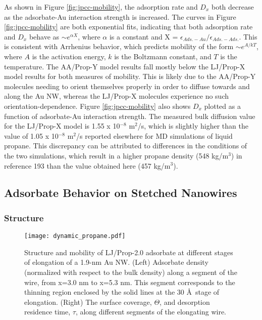 \documentclass[10pt]{report}  %
\begin{document}
As shown in Figure \ref{fig:jpcc-mobility}, the adsorption rate and $D_x$ both decrease as the adsorbate-Au interaction strength is increased.  The curves in Figure \ref{fig:jpcc-mobility} are both exponential fits, indicating that both adsorption rate and $D_x$ behave as $\sim$$e^{\alpha X}$, where $\alpha$ is a constant and X = $\epsilon_{Ads.-Au}/\epsilon_{Ads.-Ads.}$.  This is consistent with Arrhenius behavior, which predicts mobility of the form $\sim$$e^{A/kT}$, where $A$ is the activation energy, $k$ is the Boltzmann constant, and $T$ is the temperature. The AA/Prop-Y model results fall mostly below the LJ/Prop-X model results for both measures of mobility.  This is likely due to the AA/Prop-Y molecules needing to orient themselves properly in order to diffuse towards and along the Au NW, whereas the LJ/Prop-X molecules experience no such orientation-dependence.  Figure \ref{fig:jpcc-mobility} also shows $D_x$ plotted as a function of adsorbate-Au interaction strength.  The measured bulk diffusion value for the LJ/Prop-X model is 1.55 x 10$^{-8}$ m$^2$/s, which is slightly higher than the value of 1.05 x 10$^{-8}$ m$^2$/s reported elsewhere for MD simulations of liquid propane.\cite{Krishna:2005}  This discrepancy can be attributed to differences in the conditions of the two simulations, which result in a higher propane density (548 kg/m$^3$) in reference 193 than the value obtained here (457 kg/m$^3$).

\subsection{Adsorbate Behavior on Stetched Nanowires}

\subsubsection{Structure}

%
%
\begin{figure}[b!]
	\centering
	\texttt{[image: dynamic\_propane.pdf]}
	\caption{Structure and mobility of LJ/Prop-2.0 adsorbate at different stages of elongation of a 1.9-nm Au NW.  (Left) Adsorbate density (normalized with respect to the bulk density) along a segment of the wire, from x=3.0 nm to x=5.3 nm.  This segment corresponds to the thinning region enclosed by the solid lines at the 30 \AA\ stage of elongation. (Right) The surface coverage, $\Theta$, and desorption residence time, $\tau$, along different segments of the elongating wire.}
	\label{fig:dynamic_propane}
\end{figure}
\end{document}
